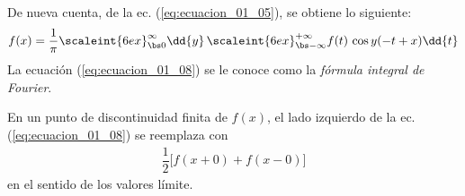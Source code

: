 De nueva cuenta, de la ec. (\ref{eq:ecuacion_01_05}), se obtiene lo siguiente:
\begin{align}
f (x) = \dfrac{1}{\pi} \scaleint{6ex}_{\bs 0}^{\infty}  \dd{y} \, \scaleint{6ex}_{\bs -\infty}^{+\infty} f (t) \, \cos y (-t + x) \dd{t} \label{eq:ecuacion_01_08}
\end{align}
La ecuación (\ref{eq:ecuacion_01_08}) se le conoce como la \emph{fórmula integral de Fourier}.
\par
En un punto de discontinuidad finita de $f (x)$, el lado izquierdo de la ec. (\ref{eq:ecuacion_01_08}) se reemplaza con
\begin{align*}
\dfrac{1}{2} \big[ f (x + 0) + f (x - 0) \big]
\end{align*}
en el sentido de los valores límite.
